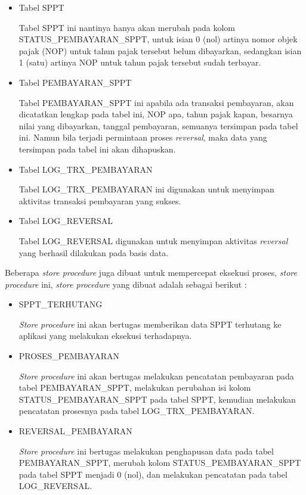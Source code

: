 \documentclass[pdftex,12pt, oneside]{article}
\begin{document}
\begin{itemize}
  \item Tabel SPPT
  
  Tabel SPPT ini nantinya hanya akan merubah pada kolom STATUS\_PEMBAYARAN\_SPPT, untuk isian 0 (nol) artinya nomor objek pajak (NOP) untuk tahun pajak tersebut belum dibayarkan, sedangkan isian 1 (satu) artinya NOP untuk tahun pajak tersebut sudah terbayar.
  
  \item Tabel PEMBAYARAN\_SPPT
  
  Tabel PEMBAYARAN\_SPPT ini apabila ada transaksi pembayaran, akan dicatatkan lengkap pada tabel ini, NOP apa, tahun pajak kapan, besarnya nilai yang dibayarkan, tanggal pembayaran, semuanya tersimpan pada tabel ini. Namun bila terjadi permintaan proses \textit{reversal}, maka data yang tersimpan pada tabel ini akan dihapuskan.
  
  \item Tabel LOG\_TRX\_PEMBAYARAN
  
  Tabel LOG\_TRX\_PEMBAYARAN ini digunakan untuk menyimpan aktivitas transaksi pembayaran yang sukses.
  
  \item Tabel LOG\_REVERSAL
  
  Tabel LOG\_REVERSAL digunakan untuk menyimpan aktivitas \textit{reversal} yang berhasil dilakukan pada basis data.
\end{itemize}

Beberapa \textit{store procedure} juga dibuat untuk mempercepat eksekusi proses, \textit{store procedure} ini, \textit{store procedure} yang dibuat adalah sebagai berikut :

\begin{itemize}
  \item SPPT\_TERHUTANG
  
  \textit{Store procedure} ini akan bertugas memberikan data SPPT terhutang ke aplikasi yang melakukan eksekusi terhadapnya.
  
  \item PROSES\_PEMBAYARAN
  
  \textit{Store procedure} ini akan bertugas melakukan pencatatan pembayaran pada tabel PEMBAYARAN\_SPPT, melakukan perubahan isi kolom STATUS\_PEMBAYARAN\_SPPT pada tabel SPPT, kemudian melakukan pencatatan prosesnya pada tabel LOG\_TRX\_PEMBAYARAN.
  
  \item REVERSAL\_PEMBAYARAN
  
  \textit{Store procedure} ini bertugas melakukan penghapusan data pada tabel PEMBAYARAN\_SPPT, merubah kolom STATUS\_PEMBAYARAN\_SPPT pada tabel SPPT menjadi 0 (nol), dan melakukan pencatatan pada tabel LOG\_REVERSAL.
\end{itemize}
\end{document}
